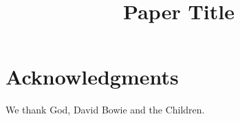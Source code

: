 \documentclass[10pt,preprint,nocopyrightspace]{sigplanconf}
\date{}
\begin{document}

\title{Paper Title}
\maketitle














\section*{Acknowledgments}

We thank God, David Bowie and the Children.

{%
  \frenchspacing
  
  
}
\end{document}
